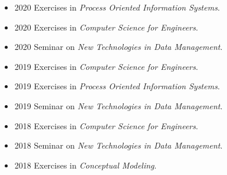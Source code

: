\documentclass[a4paper, 11pt]{article}
\begin{document}
\begin{itemize}[noitemsep, leftmargin=*]
\begin{itemize}
				\item 2020 Exercises in \emph{Process Oriented Information Systems}.

				\item 2020 Exercises in \emph{Computer Science for Engineers}.

				\item 2020 Seminar on \emph{New Technologies in Data Management}.

				\item 2019 Exercises in \emph{Computer Science for Engineers}.

				\item 2019 Exercises in \emph{Process Oriented Information Systems}.

				\item 2019 Seminar on \emph{New Technologies in Data Management}.

				\item 2018 Exercises in \emph{Computer Science for Engineers}.

				\item 2018 Seminar on \emph{New Technologies in Data Management}.

				\item 2018 Exercises in \emph{Conceptual Modeling}.
			\end{itemize}
	\end{itemize}
	\vspace{10pt}
\end{document}
